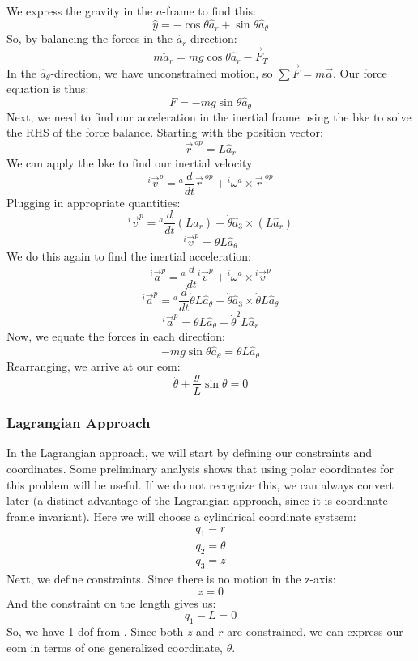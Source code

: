 We express the gravity in the $a$-frame to find this:
$$\hat{y}=-\cos\theta\hat{a}_r+\sin\theta \hat{a}_\theta$$
So, by balancing the forces in the $\hat{a}_r$-direction:
$$m{\ddot{a}}_r=mg\cos\theta \hat{a}_r-\vec{F}_T$$
In the $\hat{a}_\theta$-direction, we have unconstrained motion, so $\sum\vec{F}=m\vec{a}$. Our force equation is thus: 
$$F=-mg\sin\theta\hat{a}_{\theta}$$
Next, we need to find our acceleration in the \gls{inertial frame} using the \gls{bke} to solve the RHS of the force balance. Starting with the position vector:
$$\vec{r}^{\ op}=L\hat{a}_r$$
We can apply the \gls{bke} to find our inertial velocity:
$${}^i\vec{v}^p={}^a\frac{d}{dt}\vec{r}^{\ op}+{}^i\omega^a\times\vec{r}^{\ op}$$
Plugging in appropriate quantities:
$${}^i\vec{v}^p={}^a\frac{d}{dt}(L\hat{a}_r)+\dot{\theta}\hat{a}_3\times(L\hat{a}_r)$$
$${}^i\vec{v}^p=\dot{\theta}L\hat{a}_\theta$$
We do this again to find the inertial acceleration:
$${}^i\vec{a}^p={}^a\frac{d}{dt}{}^i\vec{v}^p+{}^i\omega^a\times{}^i\vec{v}^p$$
$${}^i\vec{a}^p={}^a\frac{d}{dt}{}\dot{\theta}L\hat{a}_\theta+\dot{\theta}\hat{a}_3\times\dot{\theta}L\hat{a}_\theta$$
$${}^i\vec{a}^p=\ddot{\theta}L\hat{a}_\theta-\dot{\theta}^2L\hat{a}_r$$
Now, we equate the forces in each direction:
$$-mg\sin\theta\hat{a}_\theta=\ddot{\theta}L\hat{a}_\theta$$
Rearranging, we arrive at our \gls{eom}:
$$\ddot{\theta}+\frac{g}{L}\sin\theta=0$$
\subsubsection{Lagrangian Approach}
In the \gls{Lagrangian} approach, we will start by defining our constraints and coordinates. Some preliminary analysis shows that using polar coordinates for this problem will be useful. If we do not recognize this, we can always convert later (a distinct advantage of the \gls{Lagrangian} approach, since it is coordinate frame invariant). Here we will choose a cylindrical coordinate systsem:
\begin{gather}
    q_1=r\\q_2=\theta\\q_3=z
\end{gather}
Next, we define constraints. Since there is no motion in the z-axis:
$$z=0$$
And the constraint on the length gives us:
$$q_1-L=0$$
So, we have 1 \gls{dof} from . Since both $z$ and $r$ are constrained, we can express our \gls{eom} in terms of one generalized coordinate, $\theta$.

